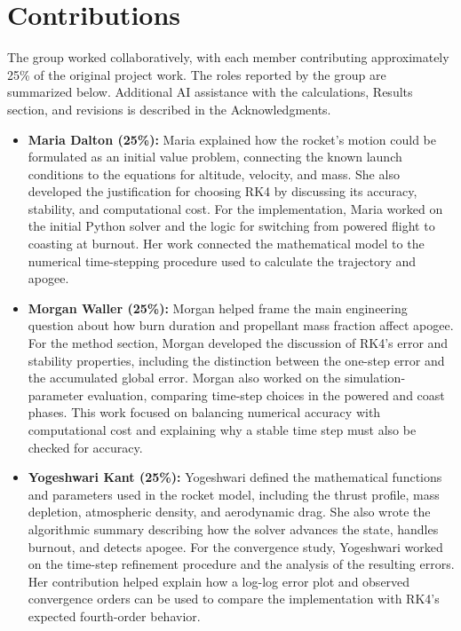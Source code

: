 \documentclass{article}
\begin{document}
\section{Contributions}
The group worked collaboratively, with each member contributing approximately 25\% of the original project work. The roles reported by the group are summarized below. Additional AI assistance with the calculations, Results section, and revisions is described in the Acknowledgments.
\begin{itemize}
\item \textbf{Maria Dalton (25\%):} Maria explained how the rocket's motion could be formulated as an initial value problem, connecting the known launch conditions to the equations for altitude, velocity, and mass. She also developed the justification for choosing RK4 by discussing its accuracy, stability, and computational cost. For the implementation, Maria worked on the initial Python solver and the logic for switching from powered flight to coasting at burnout. Her work connected the mathematical model to the numerical time-stepping procedure used to calculate the trajectory and apogee.

\item \textbf{Morgan Waller (25\%):} Morgan helped frame the main engineering question about how burn duration and propellant mass fraction affect apogee. For the method section, Morgan developed the discussion of RK4's error and stability properties, including the distinction between the one-step error and the accumulated global error. Morgan also worked on the simulation-parameter evaluation, comparing time-step choices in the powered and coast phases. This work focused on balancing numerical accuracy with computational cost and explaining why a stable time step must also be checked for accuracy.

\item \textbf{Yogeshwari Kant (25\%):} Yogeshwari defined the mathematical functions and parameters used in the rocket model, including the thrust profile, mass depletion, atmospheric density, and aerodynamic drag. She also wrote the algorithmic summary describing how the solver advances the state, handles burnout, and detects apogee. For the convergence study, Yogeshwari worked on the time-step refinement procedure and the analysis of the resulting errors. Her contribution helped explain how a log-log error plot and observed convergence orders can be used to compare the implementation with RK4's expected fourth-order behavior.


\end{itemize}
\end{document}

